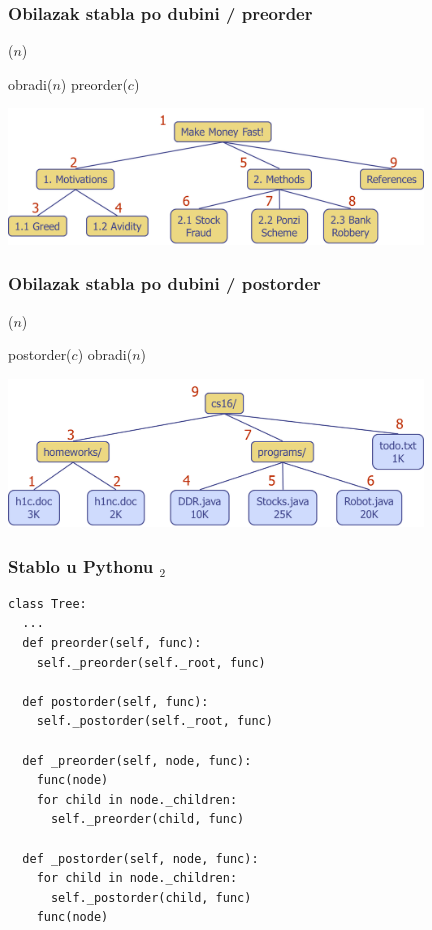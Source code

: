 \documentclass[compress,aspectratio=169]{beamer}
\begin{document}
\begin{frame}[fragile]
  \frametitle{Obilazak stabla po dubini / preorder}
($n$)
\begin{algorithmic}
\STATE obradi($n$)
  \STATE preorder($c$)
\ENDFOR
\end{algorithmic}
\begin{center}
  \includegraphics[width=11cm]{asp-08-pic03.png}
\end{center}
\end{frame}

\begin{frame}[fragile]
  \frametitle{Obilazak stabla po dubini / postorder}
($n$)
\begin{algorithmic}
  \STATE postorder($c$)
\ENDFOR
\STATE obradi($n$)
\end{algorithmic}
\begin{center}
  \includegraphics[width=11cm]{asp-08-pic04.png}
\end{center}
\end{frame}

\begin{frame}
  \frametitle{Stablo u Pythonu $_2$}
\begin{verbatim}
class Tree:
  ...
  def preorder(self, func):
    self._preorder(self._root, func)
    
  def postorder(self, func):
    self._postorder(self._root, func)
    
  def _preorder(self, node, func):
    func(node)
    for child in node._children:
      self._preorder(child, func)
  
  def _postorder(self, node, func):
    for child in node._children:
      self._postorder(child, func)
    func(node)
\end{verbatim}
\end{frame}
\end{document}
